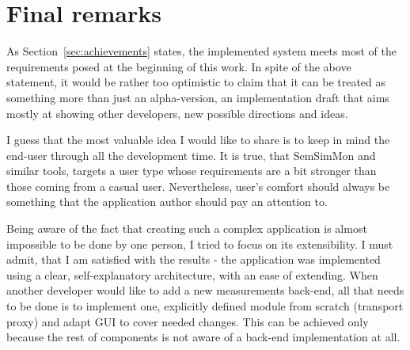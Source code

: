 %
\section{Final remarks}
\label{sec:summary}

As Section~\ref{sec:achievements} states, the implemented system meets most of the requirements posed at the beginning of this work. In spite of the above statement, it would be rather too optimistic to claim that it can be treated as something more than just an alpha-version, an implementation draft that aims mostly at showing other developers, new possible directions and ideas.

I guess that the most valuable idea I would like to share is to keep in mind the end-user through all the development time. It is true, that SemSimMon and similar tools, targets a user type whose requirements are a bit stronger than those coming from a casual user. Nevertheless, user\rq{}s comfort should always be something that the application author should pay an attention to.

Being aware of the fact that creating such a complex application is almost impossible to be done by one person, I tried to focus on its extensibility. I must admit, that I am satisfied with the results - the application was implemented using a clear, self-explanatory architecture, with an ease of extending. When another developer would like to add a new measurements back-end, all that needs to be done is to implement one, explicitly defined module from scratch (transport proxy) and adapt GUI to cover needed changes. This can be achieved only because the rest of components is not aware of a back-end implementation at all.
